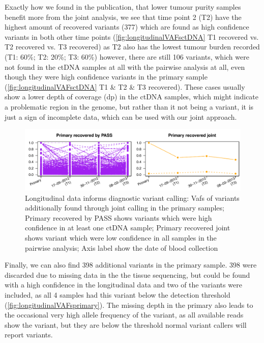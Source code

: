 Exactly how we found in the publication, that lower tumour purity samples benefit more from the joint analysis, we see that time point 2 (T2) have the highest amount of recovered variants (377) which are found as high confidence variants in both other time points (\autoref{fig:longitudinalVAFsctDNA} T1 recovered vs. T2 recovered vs. T3 recovered) as T2 also has the lowest tumour burden recorded (T1: 60\%; T2: 20\%; T3: 60\%) however, there are still 106 variants, which were not found in the ctDNA samples at all with the pairwise analysis at all, even though they were high confidence variants in the primary sample (\autoref{fig:longitudinalVAFsctDNA} T1 \& T2 \& T3 recovered). These cases usually show a lower depth of coverage (dp) in the ctDNA samples, which might indicate a problematic region in the genome, but rather than it not being a variant, it is just a sign of incomplete data, which can be used with our joint approach. 

\begin{figure}[!ht]
\centering
\includegraphics[width=.99\linewidth]{Figures/longitudinalCA9primaryVafs.pdf}
\caption[Longitudinal data informs diagnostic variant calling]{Longitudinal data informs diagnostic variant calling: Vafs of variants additionally found through joint calling in the primary samples; Primary recovered by PASS shows variants which were high confidence in at least one ctDNA sample; Primary recovered joint shows variant which were low confidence in all samples in the pairwise analysis; Axis label show the date of blood collection}\label{fig:longitudinalVAFsprimary}
\end{figure}


Finally, we can also find 398 additional variants in the   primary sample. 398 were discarded due to missing data in the the tissue sequencing, but could be found with a high confidence in the longitudinal data and two of the variants were included, as all 4 samples had this variant below the detection threshold (\autoref{fig:longitudinalVAFsprimary}). The missing depth in the primary also leads to the occasional very high allele frequency of the variant, as all available reads show the variant, but they are below the threshold normal variant callers will report variants.


